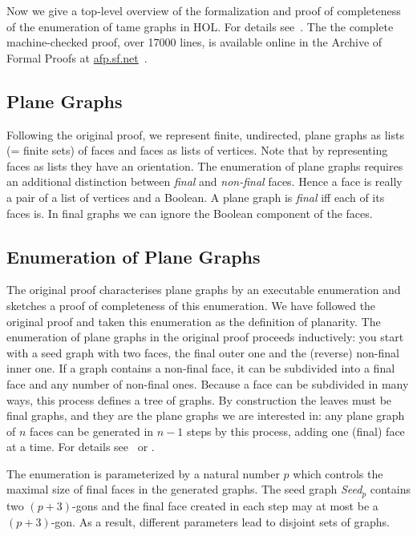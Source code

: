 \documentclass[11pt]{amsart}
\begin{document}
Now we give a top-level overview of the formalization and proof of
completeness of the enumeration of tame graphs in HOL. For details
see~\cite{NipkowBS-IJCAR06}. The the complete machine-checked proof, over
17000 lines, is available online in the Archive of Formal Proofs at
\url{afp.sf.net}~\cite{BauerN-AFP06}.

\subsection*{Plane Graphs}

Following the original proof, we represent finite, undirected, plane graphs as lists
(= finite sets) of faces and faces as lists of vertices. Note that by
representing faces as lists they have an orientation. The enumeration of
plane graphs requires an additional distinction between \emph{final}
and \emph{non-final} faces. Hence a face is really a pair of a list
of vertices and a Boolean.
A plane graph is \emph{final} iff each of its faces is.
In final graphs we can ignore the Boolean component of the faces.

\subsection*{Enumeration of Plane Graphs}

The original proof characterises plane graphs by an executable enumeration and sketches a
proof of completeness of this enumeration. We have followed the original proof and taken
this enumeration as the definition of planarity.  The enumeration of plane
graphs in the original proof proceeds inductively: you start with a seed graph with two faces, the
final outer one and the (reverse) non-final inner one. If a graph contains a
non-final face, it can be subdivided into a final face and any number of
non-final ones.  Because a face can be subdivided in many ways, this process
defines a tree of graphs. By construction the leaves must be final graphs,
and they are the plane graphs we are interested in: any plane graph of $n$
faces can be generated in $n-1$ steps by this process, adding one (final)
face at a time. For details see~\cite{Hales:2006:DCG} or
\cite{NipkowBS-IJCAR06}.

The enumeration is parameterized by a natural number $p$ which controls the
maximal size of final faces in the generated graphs. The seed graph
\textit{Seed$_p$} contains two $(p+3)$-gons and the final
face created in each step may at most be a $(p+3)$-gon. As a result,
different parameters lead to disjoint sets of graphs.
\end{document}

